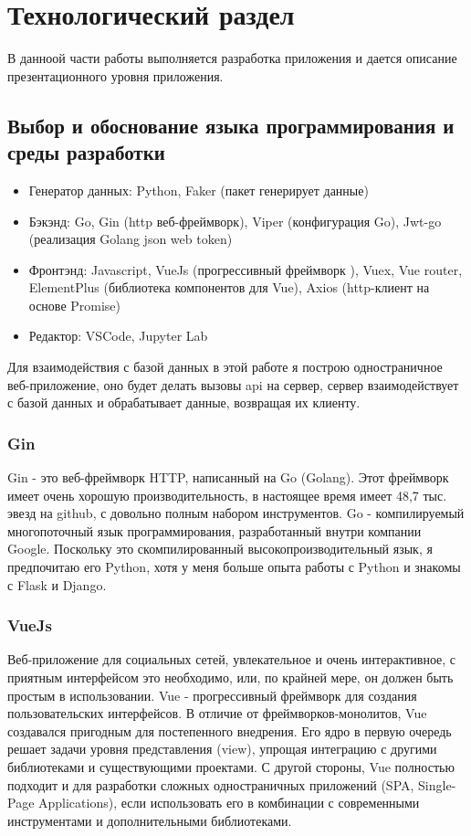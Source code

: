 \chapter{Технологический раздел}
\label{cha:impl}

В данноой части работы выполняется разработка приложения и дается описание презентационного уровня приложения.

\section{Выбор и обоснование языка программирования и среды разработки}

\begin{itemize}
    \item Генератор данных: Python, Faker (пакет генерирует данные)
    \item Бэкэнд: Go, Gin (http веб-фреймворк), Viper (конфигурация Go), Jwt-go (реализация Golang json web token)
    \item Фронтэнд: Javascript, VueJs (прогрессивный фреймворк ), Vuex, Vue router, ElementPlus (библиотека компонентов для Vue), Axios (http-клиент на основе Promise)
    \item Редактор: VSCode, Jupyter Lab
\end{itemize}

Для взаимодействия с базой данных в этой работе я построю одностраничное веб-приложение, оно будет делать вызовы api на сервер, сервер взаимодействует с базой данных и обрабатывает данные, возвращая их клиенту.

\subsection*{Gin}

Gin - это веб-фреймворк HTTP, написанный на Go (Golang).
Этот фреймворк имеет очень хорошую производительность, в настоящее время имеет 48,7 тыс. эвезд на github, с довольно полным набором инструментов.
Go - компилируемый многопоточный язык программирования, разработанный внутри компании Google.
Поскольку это скомпилированный высокопроизводительный язык, я предпочитаю его Python, хотя у меня больше опыта работы с Python и знакомы с Flask и Django.

\subsection*{VueJs}

Веб-приложение для социальных сетей, увлекательное и очень интерактивное, с приятным интерфейсом это необходимо, или, по крайней мере, он должен быть простым в использовании.
Vue - прогрессивный фреймворк для создания пользовательских интерфейсов.
В отличие от фреймворков-монолитов, Vue создавался пригодным для постепенного внедрения. Его ядро в первую очередь решает задачи уровня представления (view), упрощая интеграцию с другими библиотеками и существующими проектами.
С другой стороны, Vue полностью подходит и для разработки сложных одностраничных приложений (SPA, Single-Page Applications), если использовать его в комбинации с современными инструментами и дополнительными библиотеками.


